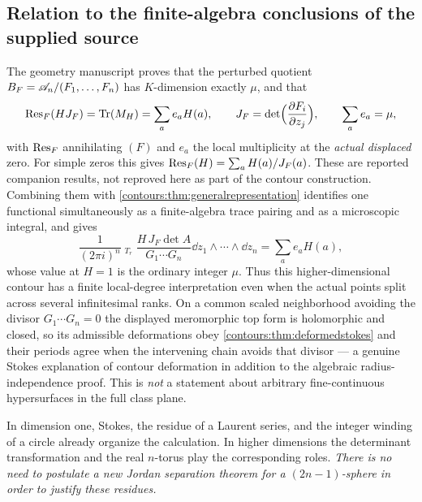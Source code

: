 \documentclass[11pt,letterpaper]{article}
\theoremstyle{definition}
\theoremstyle{remark}
\newcommand{\HInt}{\mathop{\int^{\!H}}\nolimits}
\numberwithin{equation}{section}
\begin{document}
\subsection{Relation to the finite-algebra conclusions of the supplied source}
The geometry manuscript proves that the perturbed quotient
$B_F=\mathscr A_n/(F_1,\ldots,F_n)$ has $K$-dimension exactly $\mu$, and that
\begin{equation}\label{contours:eq:traceresidue}
  \operatorname{Res}_F(HJ_F)=\operatorname{Tr}(M_H)=\sum_ae_aH(a),
  \qquad J_F=\det\Bigl(\frac{\partial F_i}{\partial z_j}\Bigr),
  \qquad \sum_ae_a=\mu ,
\end{equation}
with $\operatorname{Res}_F$ annihilating $(F)$ and $e_a$ the local multiplicity at the
\emph{actual displaced} zero. For simple zeros this gives
$\operatorname{Res}_F(H)=\sum_aH(a)/J_F(a)$. These are reported companion results, not reproved
here as part of the contour construction. Combining them with
\cref{contours:thm:generalrepresentation} identifies one functional simultaneously
as a finite-algebra trace pairing and as a microscopic integral, and gives
\begin{equation}\label{contours:eq:torustrace}
  \frac1{(2\pi i)^n}\HInt_{T_r}
  \frac{H\,J_F\det A}{G_1\cdots G_n}\dd z_1\wedge\cdots\wedge \dd z_n
  =\sum_ae_aH(a),
\end{equation}
whose value at $H=1$ is the ordinary integer $\mu$. Thus this higher-dimensional
contour has a finite local-degree interpretation even when the actual points split
across several infinitesimal ranks. On a common scaled neighborhood avoiding the
divisor $G_1\cdots G_n=0$ the displayed meromorphic top form is holomorphic and
closed, so its admissible deformations obey
\cref{contours:thm:deformedstokes} and their periods agree when the intervening
chain avoids that divisor --- a genuine Stokes explanation of contour deformation in
addition to the algebraic radius-independence proof. This is \emph{not} a statement
about arbitrary fine-continuous hypersurfaces in the full class plane.

In dimension one, Stokes, the residue of a Laurent series, and the integer winding
of a circle already organize the calculation. In higher dimensions the determinant
transformation and the real $n$-torus play the corresponding roles. \emph{There is
no need to postulate a new Jordan separation theorem for a $(2n-1)$-sphere in order
to justify these residues.}
\end{document}
